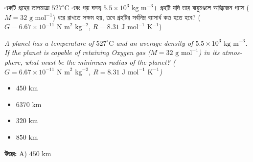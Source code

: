 \documentclass[12pt, a4paper]{article}
\begin{document}
\begin{tcolorbox}[questionbox={প্রশ্ন (Question) 21}]
    \noindent
    একটি গ্রহের তাপমাত্রা $527^\circ\text{C}$ এবং গড় ঘনত্ব $5.5 \times 10^3\text{ kg m}^{-3}$। গ্রহটি যদি তার বায়ুমণ্ডলে অক্সিজেন গ্যাস ($M = 32\text{ g mol}^{-1}$) ধরে রাখতে সক্ষম হয়, তবে গ্রহটির সর্বনিম্ন ব্যাসার্ধ কত হতে হবে? ($G = 6.67 \times 10^{-11}\text{ N m}^2\text{ kg}^{-2}$, $R = 8.31\text{ J mol}^{-1}\text{ K}^{-1}$)
    
    \vspace{0.8em}
    \begin{english}
    \noindent\textit{\color{darkgray}
    A planet has a temperature of $527^\circ\text{C}$ and an average density of $5.5 \times 10^3\text{ kg m}^{-3}$. If the planet is capable of retaining Oxygen gas ($M = 32\text{ g mol}^{-1}$) in its atmosphere, what must be the minimum radius of the planet? ($G = 6.67 \times 10^{-11}\text{ N m}^2\text{ kg}^{-2}$, $R = 8.31\text{ J mol}^{-1}\text{ K}^{-1}$)
    }
    \end{english}
\end{tcolorbox}

\begin{itemize}[label={}, leftmargin=1cm, itemsep=0.5em]
    \item[\textbf{A)}] $450\text{ km}$
    \item[\textbf{B)}] $6370\text{ km}$
    \item[\textbf{C)}] $320\text{ km}$
    \item[\textbf{D)}] $850\text{ km}$
\end{itemize}

\vspace{0.5em}
\begin{tcolorbox}[answerbox]
    \textbf{\color{success} উত্তর:} A) $450\text{ km}$
\end{tcolorbox}
\vspace{1em}
\end{document}
